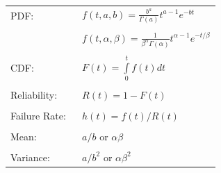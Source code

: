 \documentclass[12pt]{article}
\begin{document}
\pagestyle{empty}
\Large
{}
\pagecolor{ehandbook}

\bf
\boldmath


\begin{tabular}{ll}
PDF:                 & $ f(t, a, b) = \frac{b^a}{\Gamma(a)}t^{a-1} e^{-bt}$ \\
                     & \\
                     & $ f(t, \alpha, \beta) = \frac{1}{\beta^{\alpha}\Gamma(\alpha)}t^{\alpha-1}e^{-t/\beta}$ \\
                     & \\
CDF:                 & $ F(t) = \int \limits_{0}^{t}  f(t)dt $ \\
                     & \\
Reliability:         & $ R(t) = 1 - F(t) $ \\
                     & \\
Failure Rate: \,\,   & $ h(t) = f(t)/R(t) $ \\
                     & \\
Mean:                & $a/b$ or $\alpha \beta$ \\
                     & \\
Variance:            & $a/b^2$ or $\alpha \beta^2$ 
\end{tabular}
\end{document}
